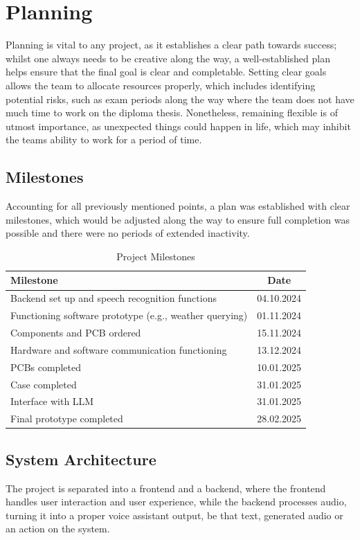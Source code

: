 \cleardoubleemptypage
\renewcommand*\chapterpagestyle{scrheadings}
\chapter{Planning}
Planning is vital to any project, as it establishes a clear path towards success;
whilst one always needs to be creative along the way, a well-established plan
helps ensure that the final goal is clear and completable.
Setting clear goals allows the team to allocate resources properly,
which includes identifying potential risks, such as exam periods along the way
where the team does not have much time to work on the diploma thesis.
Nonetheless, remaining flexible is of utmost importance, as unexpected things
could happen in life, which may inhibit the teams ability to work for a period of time.

\section{Milestones}
Accounting for all previously mentioned points, a plan was established with clear milestones,
which would be adjusted along the way to ensure full completion was possible
and there were no periods of extended inactivity.

\begin{table}[h!]
\centering
\begin{tabular}{|l|c|}
\hline
\textbf{Milestone} & \textbf{Date} \\
\hline
Backend set up and speech recognition functions & 04.10.2024 \\
Functioning software prototype (e.g., weather querying) & 01.11.2024 \\
Components and PCB ordered & 15.11.2024 \\
Hardware and software communication functioning & 13.12.2024 \\
PCBs completed & 10.01.2025 \\
Case completed & 31.01.2025 \\
Interface with LLM & 31.01.2025 \\
Final prototype completed & 28.02.2025 \\
\hline
\end{tabular}
\caption{Project Milestones}
\end{table}

\section{System Architecture}
The project is separated into a frontend and a backend, where the frontend handles user interaction and user experience,
while the backend processes audio, turning it into a proper voice assistant output,
be that text, generated audio or an action on the system.

